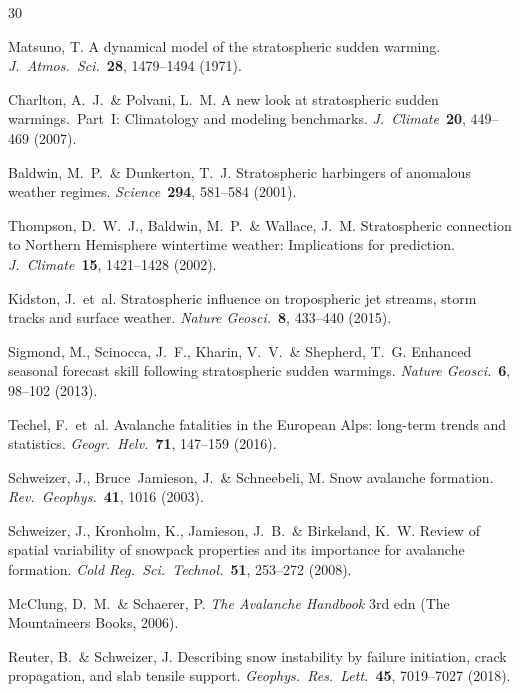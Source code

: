 \documentclass[11pt,letterpaper]{article}
\begin{document}
\begin{thebibliography}{30}

Matsuno, T. A dynamical model of the stratospheric sudden warming. \textit{J.\ Atmos.\ Sci.}\ \textbf{28}, 1479--1494 (1971).

Charlton, A.~J.\ \& Polvani, L.~M. A new look at stratospheric sudden warmings.\ Part~I: Climatology and modeling benchmarks. \textit{J.\ Climate}\ \textbf{20}, 449--469 (2007).

Baldwin, M.~P.\ \& Dunkerton, T.~J. Stratospheric harbingers of anomalous weather regimes. \textit{Science}\ \textbf{294}, 581--584 (2001).

Thompson, D.~W.~J., Baldwin, M.~P.\ \& Wallace, J.~M. Stratospheric connection to Northern Hemisphere wintertime weather: Implications for prediction. \textit{J.\ Climate}\ \textbf{15}, 1421--1428 (2002).

Kidston, J.\ et~al. Stratospheric influence on tropospheric jet streams, storm tracks and surface weather. \textit{Nature Geosci.}\ \textbf{8}, 433--440 (2015).

Sigmond, M., Scinocca, J.~F., Kharin, V.~V.\ \& Shepherd, T.~G. Enhanced seasonal forecast skill following stratospheric sudden warmings. \textit{Nature Geosci.}\ \textbf{6}, 98--102 (2013).

Techel, F.\ et~al. Avalanche fatalities in the European Alps: long-term trends and statistics. \textit{Geogr.\ Helv.}\ \textbf{71}, 147--159 (2016).

Schweizer, J., Bruce~Jamieson, J.\ \& Schneebeli, M. Snow avalanche formation. \textit{Rev.\ Geophys.}\ \textbf{41}, 1016 (2003).

Schweizer, J., Kronholm, K., Jamieson, J.~B.\ \& Birkeland, K.~W. Review of spatial variability of snowpack properties and its importance for avalanche formation. \textit{Cold Reg.\ Sci.\ Technol.}\ \textbf{51}, 253--272 (2008).

McClung, D.~M.\ \& Schaerer, P. \textit{The Avalanche Handbook} 3rd edn (The Mountaineers Books, 2006).

Reuter, B.\ \& Schweizer, J. Describing snow instability by failure initiation, crack propagation, and slab tensile support. \textit{Geophys.\ Res.\ Lett.}\ \textbf{45}, 7019--7027 (2018).


\end{thebibliography}
\end{document}
